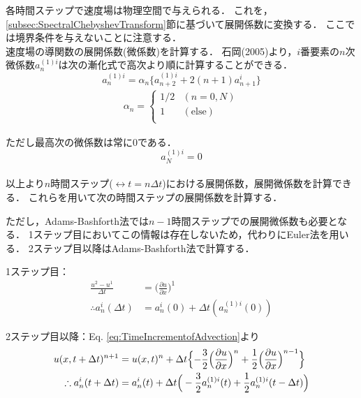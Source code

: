 \documentclass[12pt,a4paper]{jsarticle}
\begin{document}
各時間ステップで速度場は物理空間で与えられる．
これを，\ref{subsec:SpectralChebyshevTransform}節に基づいて展開係数に変換する．
ここでは境界条件を与えないことに注意する．\\

速度場の導関数の展開係数(微係数)を計算する．
石岡(2005)より，$i$番要素の$n$次微係数$a_{n}^{(1)i}$は次の漸化式で高次より順に計算することができる．
\begin{equation}
  a_{n}^{(1)i} = \alpha_{n} \{ a_{n+2}^{(1)i} +2(n+1)a_{n+1}^{i} \}
  \label{eq:DefofDerivativeCoefficient}
\end{equation}
\begin{align}
\alpha_{n} =\left\{ \begin{array}{ll}
  1/2 & (n=0,N) \\
  1  & (\mathrm{else}) \\
\end{array} \right.
\label{eq:DefofAlpha}
\end{align}

ただし最高次の微係数は常に0である．
\begin{equation}
  a_{N}^{(1)i} = 0
  \label{eq:DefofMaximumDerivativeCoefficient}
\end{equation}\\

以上より$n$時間ステップ($\leftrightarrow t = n \Delta t$)における展開係数，展開微係数を計算できる．
これらを用いて次の時間ステップの展開係数を計算する．

ただし，Adams-Bashforth法では$n-1$時間ステップでの展開微係数も必要となる．
1ステップ目においてこの情報は存在しないため，代わりにEuler法を用いる．
2ステップ目以降はAdams-Bashforth法で計算する．

1ステップ目：
\begin{align}
  \frac{u^2 -u^1}{\Delta t} &= \Big( \frac{\partial u}{\partial x} \Big)^{1} \nonumber \\
  \therefore a_{n}^i (\Delta t) &= a_{n}^i (0) +\Delta t ( a_{n}^{(1)i}(0) )
\label{eq:Timeincrement_Advection_Euler}
\end{align}

2ステップ目以降：Eq. \ref{eq:TimeIncrementofAdvection}より
\begin{align}
  u(x,t+\Delta t)^{n+1} &= u(x,t)^{n} +\Delta t \Bigl\{ -\frac{3}{2} \Big( \frac{\partial u}{\partial x} \Big)^{n} +\frac{1}{2} \Big( \frac{\partial u}{\partial x} \Big)^{n-1} \Bigr\} \nonumber \\
  \therefore a_{n}^i (t+\Delta t) &= a_{n}^i (t) +\Delta t \Big( -\frac{3}{2} a_{n}^{(1)i}(t) +\frac{1}{2} a_{n}^{(1)i}(t-\Delta t) \Big)
\label{eq:Timeincrement_Advection_AdamsBashforth}
\end{align}
\end{document}
